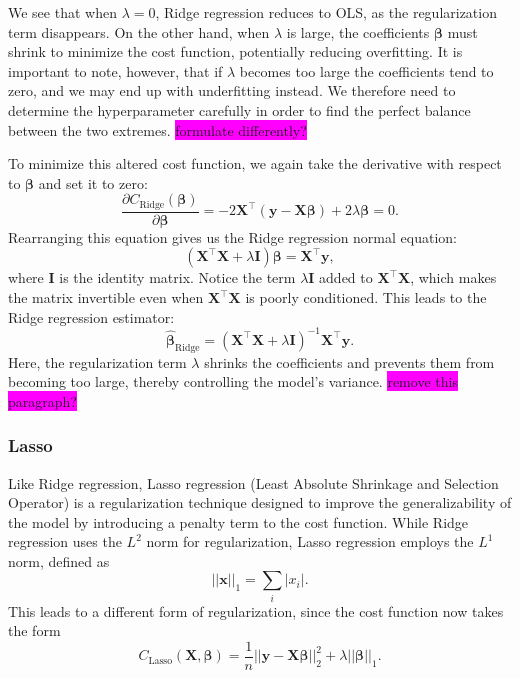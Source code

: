 \documentclass[aps,pra,english,notitlepage,reprint,nofootinbib]{revtex4-1}  %
\begin{document}
We see that when $\lambda = 0$, Ridge regression reduces to OLS, as the regularization term disappears. On the other hand, when $\lambda$ is large, the coefficients $\boldsymbol{\beta}$ must shrink to minimize the cost function, potentially reducing overfitting. It is important to note, however, that if $\lambda$ becomes too large the coefficients tend to zero, and we may end up with underfitting instead. We therefore need to determine the hyperparameter carefully in order to find the perfect balance between the two extremes. \colorbox{magenta}{formulate differently?}

To minimize this altered cost function, we again take the derivative with respect to $\boldsymbol{\beta}$ and set it to zero:
\begin{equation}
  \frac{\partial C_{\text{Ridge}}(\boldsymbol{\beta})}{\partial \boldsymbol{\beta}} = -2 \mathbf{X}^\top (\mathbf{y} - \mathbf{X} \boldsymbol{\beta}) + 2 \lambda \boldsymbol{\beta} = 0.
\end{equation}
Rearranging this equation gives us the Ridge regression normal equation:
\begin{equation}
  (\mathbf{X}^\top \mathbf{X} + \lambda \mathbf{I}) \boldsymbol{\beta} = \mathbf{X}^\top \mathbf{y},
\end{equation}
where $\mathbf{I}$ is the identity matrix. Notice the term $\lambda \mathbf{I}$ added to $\mathbf{X}^\top \mathbf{X}$, which makes the matrix invertible even when $\mathbf{X}^\top \mathbf{X}$ is poorly conditioned. This leads to the Ridge regression estimator:
\begin{equation}
  \boldsymbol{\hat{\beta}}_{\text{Ridge}} = (\mathbf{X}^\top \mathbf{X} + \lambda \mathbf{I})^{-1} \mathbf{X}^\top \mathbf{y}.
\end{equation}
Here, the regularization term $\lambda$ shrinks the coefficients and prevents them from becoming too large, thereby controlling the model's variance. \colorbox{magenta}{remove this paragraph?}



\subsubsection{Lasso}\label{subsubsec:lasso} 
Like Ridge regression, Lasso regression (Least Absolute Shrinkage and Selection Operator) is a regularization technique designed to improve the generalizability of the model by introducing a penalty term to the cost function. While Ridge regression uses the $L^2$ norm for regularization, Lasso regression employs the $L^1$ norm, defined as 
\begin{equation*}
  \left|\left|\mathbf{x}\right|\right|_1 = \sum_i|x_i|.
\end{equation*}
This leads to a different form of regularization, since the cost function now takes the form
\begin{equation}
  C_{\text{Lasso}}(\mathbf{X},\boldsymbol{\beta}) = \frac{1}{n}\left|\left|\mathbf{y}-\mathbf{X}\boldsymbol{\beta} \right|\right|_2^2 + \lambda \left|\left|\boldsymbol{\beta}\right|\right|_1.
\end{equation}
\end{document}
